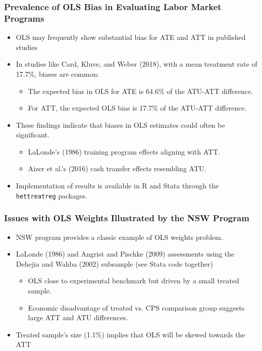 \documentclass{beamer}
\begin{document}
\begin{frame}
\frametitle{Prevalence of OLS Bias in Evaluating Labor Market Programs}
\begin{itemize}
  \item OLS may frequently show substantial bias for ATE and ATT in published studies
  \item In studies like Card, Kluve, and Weber (2018), with a mean treatment rate of 17.7\%, biases are common:
    \begin{itemize}
      \item The expected bias in OLS for ATE is 64.6\% of the ATU-ATT difference.
      \item For ATT, the expected OLS bias is 17.7\% of the ATU-ATT difference.
    \end{itemize}
  \item These findings indicate that biases in OLS estimates could often be significant.
    \begin{itemize}
      \item LaLonde's (1986) training program effects aligning with ATT.
      \item Aizer et al.'s (2016) cash transfer effects resembling ATU.
    \end{itemize}
  \item Implementation of results is available in R and Stata through the \texttt{hettreatreg} packages.
\end{itemize}
\end{frame}


\begin{frame}
\frametitle{Issues with OLS Weights Illustrated by the NSW Program}
\begin{itemize}
  \item NSW program provides a classic example of OLS weights problem.
  \item LaLonde (1986) and Angrist and Pischke (2009) assessments using the Dehejia and Wahba (2002) subsample (see Stata code together)
    \begin{itemize}
      \item OLS close to experimental benchmark but driven by a small treated sample.
      \item Economic disadvantage of treated vs. CPS comparison group suggests large ATT and ATU differences.
    \end{itemize}
  \item Treated sample's size (1.1\%) implies that OLS will be skewed towards the ATT 
\end{itemize}
\end{frame}
\end{document}
